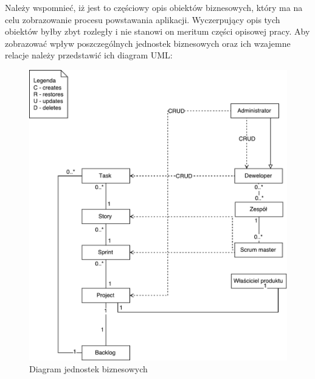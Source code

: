 Należy wspomnieć, iż jest to częściowy opis obiektów biznesowych, który ma na celu zobrazowanie procesu powstawania aplikacji. Wyczerpujący opis tych obiektów byłby zbyt rozległy i nie stanowi on meritum części opisowej pracy. Aby zobrazować wpływ poszczególnych jednostek biznesowych oraz ich wzajemne relacje należy przedstawić ich diagram UML:
\begin{figure}[h!]
	\centering
	\includegraphics[width=15cm]{rysunki/diaguml.pdf}	
	\caption{Diagram jednostek biznesowych}
	\label{fig:diaguml}
\end{figure}

